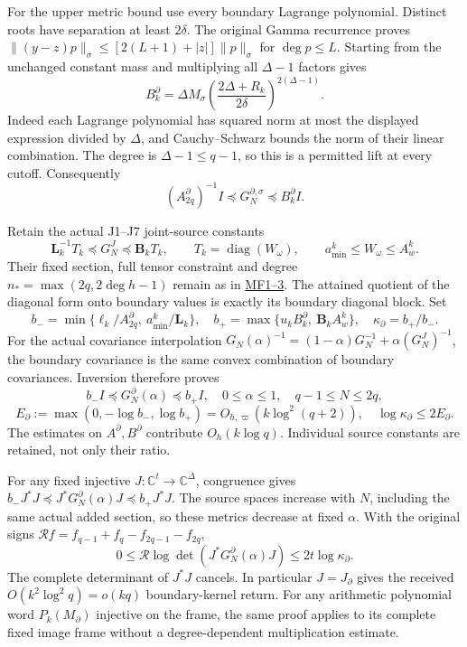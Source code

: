 \documentclass[11pt]{article}
\begin{document}
For the upper metric bound use every boundary Lagrange polynomial. Distinct roots have separation at least \(2\delta\). The original Gamma recurrence proves \(\|(y-z)p\|_\sigma\le[2(L+1)+|z|]\|p\|_\sigma\) for \(\deg p\le L\). Starting from the unchanged constant mass and multiplying all \(\Delta-1\) factors gives \[
B_k^\partial=\Delta M_\sigma
\left(\frac{2\Delta+R_k}{2\delta}\right)^{2(\Delta-1)}.
\tag{IC13}
\] Indeed each Lagrange polynomial has squared norm at most the displayed expression divided by \(\Delta\), and Cauchy--Schwarz bounds the norm of their linear combination. The degree is \(\Delta-1\le q-1\), so this is a permitted lift at every cutoff. Consequently \[
(A_{2q}^\partial)^{-1}I\preceq G_N^{\partial,\sigma}\preceq B_k^\partial I.
\]

Retain the actual J1--J7 joint-source constants \[
\mathbf L_k^{-1}T_k\preceq G_N^J\preceq\mathbf B_k T_k,\qquad
T_k=\operatorname{diag}(W_\omega),\qquad
a_{\min}^k\le W_\omega\le A_w^k.
\] Their fixed section, full tensor constraint and degree \(n_*=\max(2q,2\deg h-1)\) remain as in \href{https://github.com/KokunoYumeto/zeta-function-research-reader/blob/cb9705da84d6f8689611914ed9659298e620ba0a/workbenches/splitzero-tandem/continuations/20260921-moving-rational-family/ACTIVATED_RATIONAL_PROOFS.md}{MF1--3}. The attained quotient of the diagonal form onto boundary values is exactly its boundary diagonal block. Set \[
b_-=\min\{\ell_k/A_{2q}^\partial,\ a_{\min}^k/\mathbf L_k\},\quad
b_+=\max\{u_kB_k^\partial,\ \mathbf B_kA_w^k\},\quad
\kappa_\partial=b_+/b_-.
\] For the actual covariance interpolation \(G_N(\alpha)^{-1}=(1-\alpha)G_N^{-1}+\alpha(G_N^J)^{-1}\), the boundary covariance is the same convex combination of boundary covariances. Inversion therefore proves \[
b_-I\preceq G_N^\partial(\alpha)\preceq b_+I,\quad
0\le\alpha\le1,\quad q-1\le N\le2q,
\tag{IC14}
\] \[
E_\partial:=\max(0,-\log b_-,\log b_+)
=O_{h,\varpi}(k\log^2(q+2)),\quad
\log\kappa_\partial\le2E_\partial.
\tag{IC15}
\] The estimates on \(A^\partial,B^\partial\) contribute \(O_h(k\log q)\). Individual source constants are retained, not only their ratio.

For any fixed injective \(J:\mathbb C^t\to\mathbb C^\Delta\), congruence gives \(b_-J^*J\preceq J^*G_N^\partial(\alpha)J\preceq b_+J^*J\). The source spaces increase with \(N\), including the same actual added section, so these metrics decrease at fixed \(\alpha\). With the original signs \(\mathcal R f=f_{q-1}+f_q-f_{2q-1}-f_{2q}\), \[
0\le\mathcal R\log\det(J^*G_N^\partial(\alpha)J)
\le2t\log\kappa_\partial.
\tag{IC16}
\] The complete determinant of \(J^*J\) cancels. In particular \(J=J_\partial\) gives the received \(O(k^2\log^2q)=o(kq)\) boundary-kernel return. For any arithmetic polynomial word \(P_k(M_\partial)\) injective on the frame, the same proof applies to its complete fixed image frame without a degree-dependent multiplication estimate.
\end{document}
